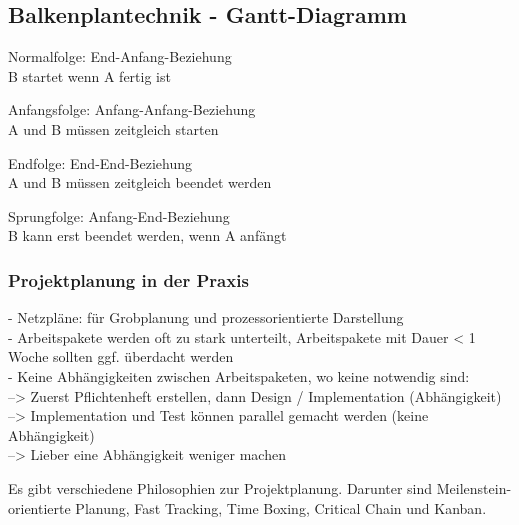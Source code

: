 \subsection{Balkenplantechnik - Gantt-Diagramm}

\begin{minipage}{7.5cm}
	Normalfolge: End-Anfang-Beziehung \\
	B startet wenn A fertig ist
\end{minipage}
\begin{minipage}{7.4cm}
	Anfangsfolge: Anfang-Anfang-Beziehung \\
	A und B müssen zeitgleich starten
\end{minipage}



\begin{minipage}{7.5cm}
	Endfolge: End-End-Beziehung \\
	A und B müssen zeitgleich beendet werden
\end{minipage}
\begin{minipage}{7.4cm}
	Sprungfolge: Anfang-End-Beziehung \\
	B kann erst beendet werden, wenn A anfängt
\end{minipage}


\subsubsection{Projektplanung in der Praxis}
- Netzpläne: für Grobplanung und prozessorientierte Darstellung \\
- Arbeitspakete werden oft zu stark unterteilt, Arbeitspakete mit Dauer < 1 Woche sollten ggf. überdacht werden \\
- Keine Abhängigkeiten zwischen Arbeitspaketen, wo keine notwendig sind: \\
--> Zuerst Pflichtenheft erstellen, dann Design / Implementation (Abhängigkeit) \\
--> Implementation und Test können parallel gemacht werden (keine Abhängigkeit) \\
--> Lieber eine Abhängigkeit weniger machen

Es gibt verschiedene Philosophien zur Projektplanung. Darunter sind Meilenstein-orientierte Planung, Fast Tracking, Time Boxing, Critical Chain und Kanban.




